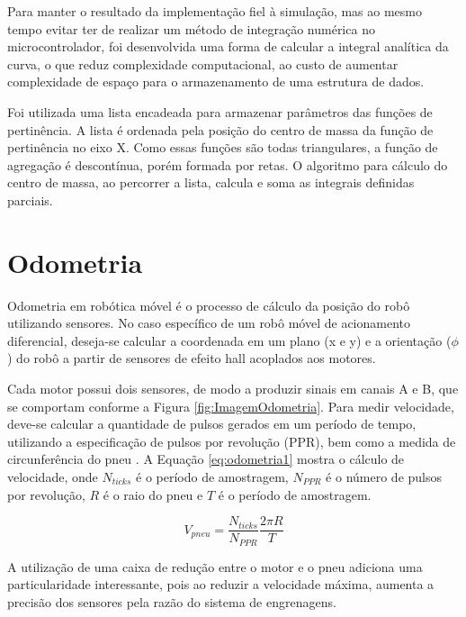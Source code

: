 	Para manter o resultado da implementação fiel à simulação, mas ao mesmo tempo evitar ter 
	de realizar um método de integração numérica no microcontrolador, foi desenvolvida uma forma
	de calcular a integral analítica da curva, o que reduz complexidade computacional, ao custo
	de aumentar complexidade de espaço para o armazenamento de uma estrutura de dados. 
	
	Foi utilizada uma lista encadeada para armazenar parâmetros das funções de pertinência. 
	A lista é ordenada pela posição do centro de massa da função de pertinência no eixo X. Como 
	essas funções são todas triangulares, a função de agregação é descontínua, porém formada por 
	retas. O algoritmo para cálculo do centro de massa, ao percorrer a lista, calcula e soma 
	as integrais definidas parciais. 
	
\section{Odometria \label{SEC:ODOMETRIA}}

Odometria em robótica móvel é o processo de cálculo da posição do robô
utilizando sensores. No caso específico de um robô móvel de acionamento
diferencial, deseja-se calcular a coordenada em um plano (x e y) e a 
orientação ($\phi$) do robô a partir de sensores de efeito hall acoplados
aos motores. \cite{art:odometria1}

Cada motor possui dois sensores, de modo a produzir sinais em canais 
A e B, que se comportam conforme a Figura \ref{fig:ImagemOdometria}. Para medir velocidade, 
deve-se  calcular a quantidade de pulsos gerados em um período de tempo,
utilizando a especificação de pulsos por revolução (PPR), bem como a
medida de circunferência do pneu \cite{odometria2}. A Equação 
\ref{eq:odometria1} mostra o cálculo de velocidade, onde $N_{ticks}$
é o período de amostragem, $N_{PPR}$ é o número de pulsos por revolução,
$R$ é o raio do pneu e $T$ é o período de amostragem.



\begin{equation}
	\label{eq:odometria1}
	V_{pneu} = \frac{N_{ticks}}{N_{PPR}} \frac{2\pi R}{T}
\end{equation}

A utilização de uma caixa de redução entre o motor e o pneu adiciona
uma particularidade interessante, pois ao reduzir a velocidade
máxima, aumenta a precisão dos sensores pela razão do sistema de 
engrenagens. 
	
